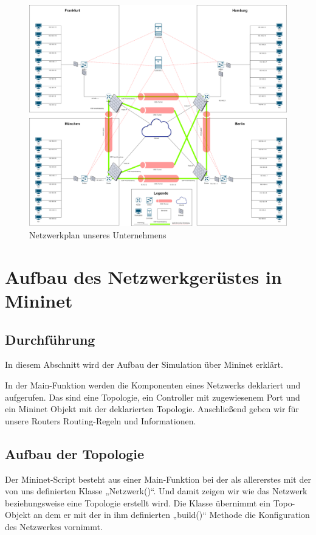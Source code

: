 \documentclass[fontsize=12pt,paper=a4,open=any,parskip=half,
  twoside=false,toc=listof,toc=bibliography,fleqn,leqno,
  captions=nooneline,captions=tableabove,british]{scrbook}
\begin{document}
\begin{figure}[htbp]
 \centering
 \includegraphics[width=1.0\textwidth]{Bilder/netzwerkplan}
 \captionsetup{justification=centering,margin=2cm}
 \caption{Netzwerkplan unseres Unternehmens}
 \label{networkplan}
\end{figure}

\section{Aufbau des Netzwerkgerüstes in Mininet}
\subsection{Durchführung}
In diesem Abschnitt wird der Aufbau der Simulation über Mininet erklärt.
 
In der Main-Funktion werden die Komponenten eines Netzwerks deklariert und aufgerufen. Das sind eine Topologie, ein Controller mit zugewiesenem Port und ein Mininet Objekt mit der deklarierten Topologie. Anschließend geben wir für unsere Routers Routing-Regeln und Informationen.

\subsection{Aufbau der Topologie}
Der Mininet-Script besteht aus einer Main-Funktion bei der als allererstes mit der von uns definierten Klasse „Netzwerk()“. Und damit zeigen wir wie das Netzwerk beziehungsweise eine Topologie erstellt wird. Die Klasse übernimmt ein Topo-Objekt an dem er mit der in ihm definierten „build()“ Methode die Konfiguration des Netzwerkes vornimmt. 
 
\end{document}
